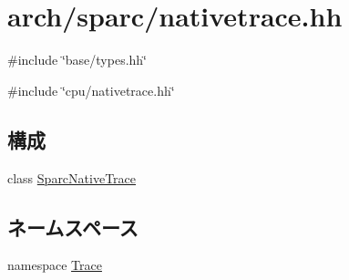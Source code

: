 \hypertarget{arch_2sparc_2nativetrace_8hh}{
\section{arch/sparc/nativetrace.hh}
\label{arch_2sparc_2nativetrace_8hh}
}
{\ttfamily \#include \char`\"{}base/types.hh\char`\"{}}\par
{\ttfamily \#include \char`\"{}cpu/nativetrace.hh\char`\"{}}\par
\subsection*{構成}
\begin{DoxyCompactItemize}
\item 
class \hyperlink{classTrace_1_1SparcNativeTrace}{SparcNativeTrace}
\end{DoxyCompactItemize}
\subsection*{ネームスペース}
\begin{DoxyCompactItemize}
\item 
namespace \hyperlink{namespaceTrace}{Trace}
\end{DoxyCompactItemize}
